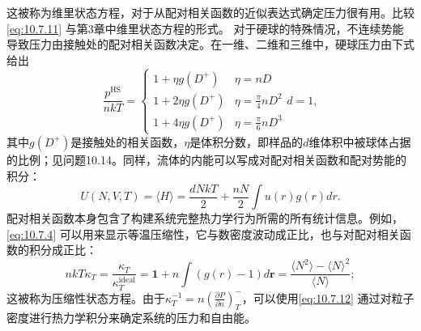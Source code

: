 这被称为维里状态方程，对于从配对相关函数的近似表达式确定压力很有用。比较\autoref{eq:10.7.11} 与第3章中维里状态方程的形式。
对于硬球的特殊情况，不连续势能导致压力由接触处的配对相关函数决定。在一维、二维和三维中，硬球压力由下式给出
\begin{equation}\tag{10.7.10}\label{eq:10.7.10}
\frac { p ^{\mathrm { H S} } } { n k T } = \left\{ \begin{array}{ll} { 1 + \eta g ( D ^{+} ) } & { \eta = n D } \\{ 1 + 2 \eta g ( D ^{+} ) } & { \eta = \frac { \pi } { 4 } n D ^{2} } \\{ 1 + 4 \eta g ( D ^{+} ) } & { \eta = \frac { \pi } { 6 } n D ^{3} } \end{array} \right.  d = 1 ,
\end{equation}
其中\(g(D^{+})\)是接触处的相关函数，\(\eta\)是体积分数，即样品的\(d\)维体积中被球体占据的比例；见问题10.14。同样，流体的内能可以写成对配对相关函数和配对势能的积分：
\begin{equation}\tag{10.7.11}\label{eq:10.7.11}
U ( N , V , T ) = \langle H \rangle = \frac { d N k T } { 2 } + \frac { n N } { 2 } \int u ( r ) g ( r ) d r .
\end{equation}
配对相关函数本身包含了构建系统完整热力学行为所需的所有统计信息。例如，\autoref{eq:10.7.4} 可以用来显示等温压缩性，它与数密度波动成正比，也与对配对相关函数的积分成正比：
\begin{equation}\tag{10.7.12}\label{eq:10.7.12}
n k T \kappa _ { T } = \frac { \kappa _ { T } } { \kappa _ { T } ^{\mathrm { i d e a l} } } = \mathbf { 1 } + n \int ( g ( r ) - 1 ) d \mathbf { r } = \frac { \langle N ^{2} \rangle - \langle N \rangle ^{2} } { \langle N \rangle } ;
\end{equation}
这被称为压缩性状态方程。由于\(\kappa_{T}^{-1}=n\left(\frac{\partial P}{\partial n}\right)_{T}^{-}\)，可以使用\autoref{eq:10.7.12} 通过对粒子密度进行热力学积分来确定系统的压力和自由能。
